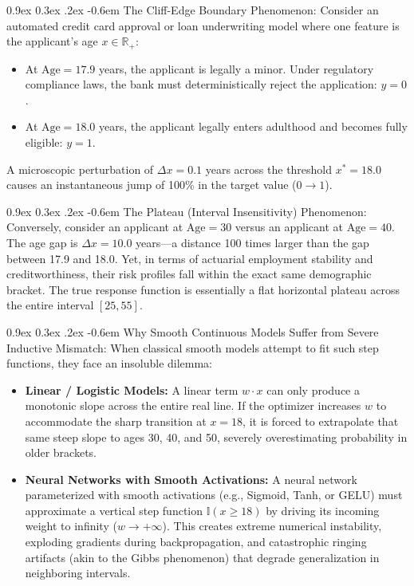 \documentclass[11pt,a4paper]{article}
\makeatletter
\renewcommand\paragraph{\@startsection{paragraph}{4}{\z@}%
                                     {0.9ex \@plus0.3ex \@minus.2ex}%
                                     {-0.6em}%
                                     {\normalfont\normalsize\bfseries}}
\newcommand{\R}{\mathbb{R}}
\makeatother
\begin{document}
\paragraph{The Cliff-Edge Boundary Phenomenon:}
Consider an automated credit card approval or loan underwriting model where one feature is the applicant's age $x \in \R_+$:
\begin{itemize}
    \item At $\text{Age} = 17.9$ years, the applicant is legally a minor. Under regulatory compliance laws, the bank must deterministically reject the application: $y = 0$.
    \item At $\text{Age} = 18.0$ years, the applicant legally enters adulthood and becomes fully eligible: $y = 1$.
\end{itemize}
A microscopic perturbation of $\Delta x = 0.1$ years across the threshold $x^* = 18.0$ causes an instantaneous jump of 100\% in the target value ($0 \to 1$). 

\paragraph{The Plateau (Interval Insensitivity) Phenomenon:}
Conversely, consider an applicant at $\text{Age} = 30$ versus an applicant at $\text{Age} = 40$. The age gap is $\Delta x = 10.0$ years---a distance 100 times larger than the gap between 17.9 and 18.0. Yet, in terms of actuarial employment stability and creditworthiness, their risk profiles fall within the exact same demographic bracket. The true response function is essentially a flat horizontal plateau across the entire interval $[25, 55]$.

\paragraph{Why Smooth Continuous Models Suffer from Severe Inductive Mismatch:}
When classical smooth models attempt to fit such step functions, they face an insoluble dilemma:
\begin{itemize}
    \item \textbf{Linear / Logistic Models:} A linear term $w \cdot x$ can only produce a monotonic slope across the entire real line. If the optimizer increases $w$ to accommodate the sharp transition at $x = 18$, it is forced to extrapolate that same steep slope to ages 30, 40, and 50, severely overestimating probability in older brackets.
    \item \textbf{Neural Networks with Smooth Activations:} A neural network parameterized with smooth activations (e.g., Sigmoid, Tanh, or GELU) must approximate a vertical step function $\mathbb{I}(x \ge 18)$ by driving its incoming weight to infinity ($w \to +\infty$). This creates extreme numerical instability, exploding gradients during backpropagation, and catastrophic ringing artifacts (akin to the Gibbs phenomenon) that degrade generalization in neighboring intervals.
\end{itemize}
\end{document}
